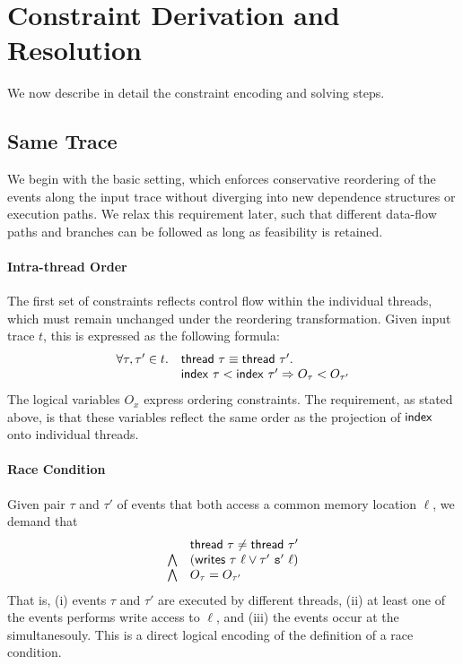 \section{Constraint Derivation and Resolution}

We now describe in detail the constraint encoding and solving steps.

\subsection{Same Trace}

We begin with the basic setting, which enforces conservative reordering of the events along the input trace without diverging into new dependence structures or execution paths. We relax this requirement later, such that different data-flow paths and branches can be followed as long as feasibility is retained.

\paragraph{Intra-thread Order}

The first set of constraints reflects control flow within the individual threads, which must remain unchanged under the reordering transformation. Given input trace $t$, this is expressed as the following formula:
$$
\begin{array}{rl}
	\forall \tau,\tau' \in t. & {\sf thread}\ \tau \equiv {\sf thread}\ \tau'. \\
										& {\sf index}\ \tau < {\sf index}\ \tau' \Rightarrow O_{\tau} < O_{\tau'}
\end{array}
$$ 
The logical variables $O_x$ express ordering constraints. The requirement, as stated above, is that these variables
reflect the same order as the projection of ${\sf index}$ onto individual threads.

\paragraph{Race Condition}

Given pair $\tau$ and $\tau'$ of events that both access a common memory location $\ell$, we demand that
$$
\begin{array}{rl}
					& {\sf thread}\ \tau \neq {\sf thread}\ \tau' \\
\bigwedge 	& ({\sf writes}\ \tau\ \ell \vee \tau'\ {\tt s}'\ \ell) \\
\bigwedge   & O_{\tau} = O_{\tau'}
\end{array}
$$
That is, (i) events $\tau$ and $\tau'$ are executed by different threads, (ii) at least one of the events performs write access to $\ell$, and (iii) the events occur at the simultanesouly. This is a direct logical encoding of the definition of a race condition.

